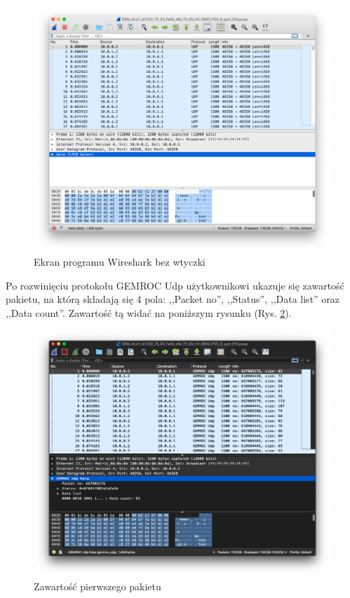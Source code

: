 \documentclass[a4paper, 12pt, twoside, openright]{article}
\begin{document}
	\begin{figure}[H]
		\centering
			\includegraphics[width=1.0\textwidth]{img/screenshot_no_dissector.png}
		\caption{Ekran programu Wireshark bez wtyczki}
		\label{fig:no_dis}
	\end{figure}



Po rozwinięciu protokołu GEMROC Udp użytkownikowi ukazuje się zawartość pakietu, na którą
składają się 4 pola: ,,Packet no'', ,,Status'', ,,Data list'' oraz ,,Data count''. Zawartość tą widać na poniższym rysunku (Rys. \ref{fig:dis_pack}).

	\begin{figure}[H]
		\centering
			\includegraphics[width=1.0\textwidth]{img/screenshot_dissector_list.png}
		\caption{Zawartość pierwszego pakietu}
		\label{fig:dis_pack}
	\end{figure}
\end{document}
